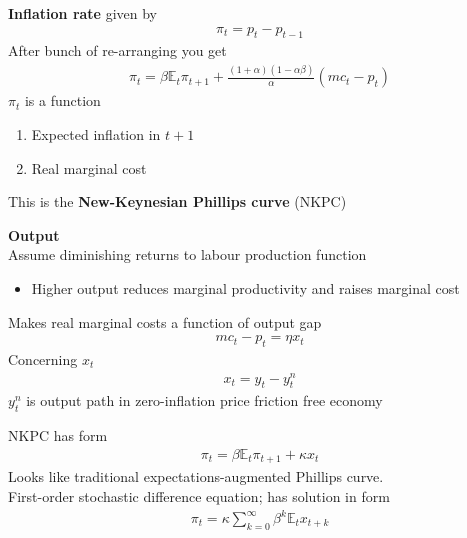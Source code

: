 \documentclass{beamer}
\begin{document}
\begin{frame}
  \textbf{Inflation rate} given by
  \begin{align}
    \pi_t=p_t-p_{t-1}
  \end{align}
  After bunch of re-arranging you get  
\begin{align}
  \pi_t= \beta \mathbb{E}_t \pi_{t+1} + \frac{(1+\alpha)(1-\alpha \beta)}{\alpha}(mc_t - p_t)
\end{align}
$\pi_t$ is a function 
\begin{enumerate}
  \item Expected inflation in $t+1$
  \item Real marginal cost
\end{enumerate}
  This is the \textbf{New-Keynesian Phillips curve} (NKPC)
\end{frame}

\begin{frame}
  \textbf{Output}\\
  Assume diminishing returns to labour production function
  \begin{itemize}
    \item Higher output reduces marginal productivity and raises marginal cost 
  \end{itemize}
  \medskip
  Makes real marginal costs a function of output gap  
\begin{align}
  mc_t-p_t=\eta x_t
\end{align}
Concerning $x_t$
\begin{align}
  x_t=y_t-y_t^n
\end{align}
$y_t^n$ is output path in zero-inflation price friction free economy
\end{frame}

\begin{frame}
 NKPC has form
  \begin{align}
  \pi_t=\beta \mathbb{E}_t \pi_{t+1} + \kappa x_t
\end{align}
\medskip
 Looks like traditional expectations-augmented Phillips curve.\\
 First-order stochastic difference equation; has solution in form
\begin{align}  
  \pi_t=\kappa \sum_{k=0}^{\infty}\beta^k \mathbb{E}_t x_{t+k} 
\end{align}
\end{frame}
\end{document}
